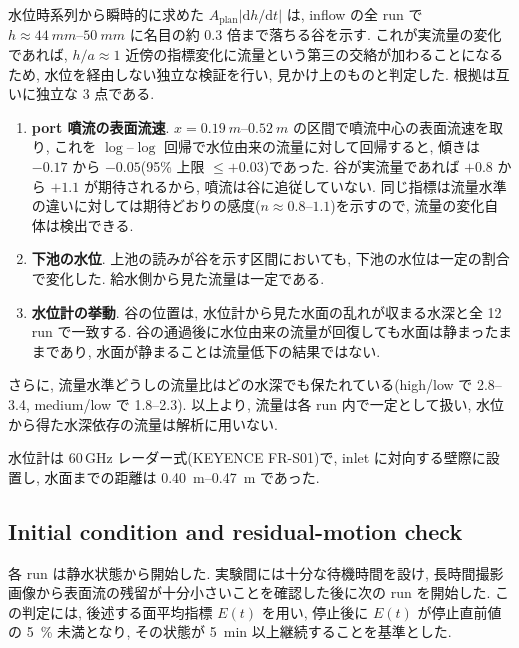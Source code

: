 水位時系列から瞬時的に求めた $A_{\mathrm{plan}} \left| \mathrm{d}h/\mathrm{d}t \right|$ は, inflow の全 run で $h \approx \SIrange{44}{50}{mm}$ に名目の約 0.3 倍まで落ちる谷を示す. これが実流量の変化であれば, $h/a \approx 1$ 近傍の指標変化に流量という第三の交絡が加わることになるため, 水位を経由しない独立な検証を行い, 見かけ上のものと判定した. 根拠は互いに独立な 3 点である.
\begin{enumerate}
  \item \textbf{port 噴流の表面流速}. $x = \SIrange{0.19}{0.52}{m}$ の区間で噴流中心の表面流速を取り, これを $\log$--$\log$ 回帰で水位由来の流量に対して回帰すると, 傾きは $-0.17$ から $-0.05$(95\% 上限 $\le +0.03$)であった. 谷が実流量であれば $+0.8$ から $+1.1$ が期待されるから, 噴流は谷に追従していない. 同じ指標は流量水準の違いに対しては期待どおりの感度($n \approx 0.8$--$1.1$)を示すので, 流量の変化自体は検出できる.
  \item \textbf{下池の水位}. 上池の読みが谷を示す区間においても, 下池の水位は一定の割合で変化した. 給水側から見た流量は一定である.
  \item \textbf{水位計の挙動}. 谷の位置は, 水位計から見た水面の乱れが収まる水深と全 12 run で一致する. 谷の通過後に水位由来の流量が回復しても水面は静まったままであり, 水面が静まることは流量低下の結果ではない.
\end{enumerate}
さらに, 流量水準どうしの流量比はどの水深でも保たれている(high/low で 2.8--3.4, medium/low で 1.8--2.3). 以上より, 流量は各 run 内で一定として扱い, 水位から得た水深依存の流量は解析に用いない.

水位計は 60\,GHz レーダー式(KEYENCE FR-S01)で, inlet に対向する壁際に設置し, 水面までの距離は \SIrange{0.40}{0.47}{m} であった.

\subsection{Initial condition and residual-motion check}
\label{sec:methods_initial}

各 run は静水状態から開始した. 実験間には十分な待機時間を設け, 長時間撮影画像から表面流の残留が十分小さいことを確認した後に次の run を開始した. この判定には, 後述する面平均指標 $E(t)$ を用い, 停止後に $E(t)$ が停止直前値の \SI{5}{\percent} 未満となり, その状態が \SI{5}{min} 以上継続することを基準とした.

